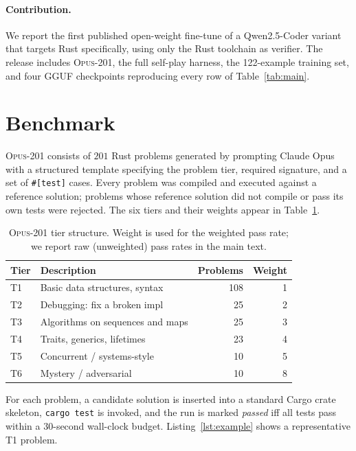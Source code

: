 \documentclass[11pt,a4paper]{article}
\begin{document}
\paragraph{Contribution.} We report the first published open-weight fine-tune of a Qwen2.5-Coder variant that targets Rust specifically, using only the Rust toolchain as verifier. The release includes \textsc{Opus-201}, the full self-play harness, the 122-example training set, and four GGUF checkpoints reproducing every row of Table~\ref{tab:main}.

\section{Benchmark}
\label{sec:bench}

\textsc{Opus-201} consists of $201$ Rust problems generated by prompting Claude Opus with a structured template specifying the problem tier, required signature, and a set of \texttt{\#[test]} cases. Every problem was compiled and executed against a reference solution; problems whose reference solution did not compile or pass its own tests were rejected. The six tiers and their weights appear in Table~\ref{tab:tiers}.

\begin{table}[h]
\centering
\small
\caption{\textsc{Opus-201} tier structure. Weight is used for the weighted pass rate; we report raw (unweighted) pass rates in the main text.}
\label{tab:tiers}
\begin{tabular}{llrr}
\toprule
Tier & Description & Problems & Weight \\
\midrule
T1 & Basic data structures, syntax    & 108 & 1 \\
T2 & Debugging: fix a broken impl     & 25  & 2 \\
T3 & Algorithms on sequences and maps & 25  & 3 \\
T4 & Traits, generics, lifetimes      & 23  & 4 \\
T5 & Concurrent / systems-style       & 10  & 5 \\
T6 & Mystery / adversarial            & 10  & 8 \\
\bottomrule
\end{tabular}
\end{table}

For each problem, a candidate solution is inserted into a standard Cargo crate skeleton, \texttt{cargo test} is invoked, and the run is marked \emph{passed} iff all tests pass within a 30-second wall-clock budget. Listing~\ref{lst:example} shows a representative T1 problem.
\end{document}
